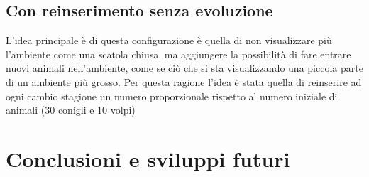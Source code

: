 \documentclass[11pt]{article}
\begin{document}
\subsection{Con reinserimento senza evoluzione}
L'idea principale è di questa configurazione è quella di non visualizzare più l'ambiente come una scatola chiusa, ma aggiungere la possibilità di fare entrare nuovi animali nell'ambiente, come se ciò che si sta visualizzando una piccola parte di un ambiente più grosso. 
Per questa ragione l'idea è stata quella di reinserire ad ogni cambio stagione un numero proporzionale rispetto al numero iniziale di animali (30 conigli e 10 volpi) %


\section{Conclusioni e sviluppi futuri}






\newpage
\printbibliography	
\end{document}
